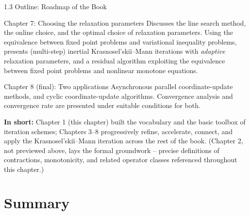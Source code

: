 \documentclass[aspectratio=169,10pt]{beamer}
\begin{document}
\begin{frame}[allowframebreaks]{1.3 Outline: Roadmap of the Book}
\begin{block}{Chapter 7: Choosing the relaxation parameters}
Discusses the line search method, the online choice, and the optimal
choice of relaxation parameters. Using the equivalence between fixed
point problems and variational inequality problems, presents (multi-step)
inertial Krasnosel'ski\u{i}--Mann iterations with \emph{adaptive}
relaxation parameters, and a residual algorithm exploiting the
equivalence between fixed point problems and nonlinear monotone
equations.
\end{block}

\framebreak

\begin{block}{Chapter 8 (final): Two applications}
Asynchronous parallel coordinate-update methods, and cyclic
coordinate-update algorithms. Convergence analysis and convergence rate
are presented under suitable conditions for both.
\end{block}

\textbf{In short:} Chapter 1 (this chapter) built the vocabulary and the
basic toolbox of iteration schemes; Chapters 3--8 progressively refine,
accelerate, connect, and apply the Krasnosel'ski\u{i}--Mann iteration
across the rest of the book. (Chapter 2, not previewed above, lays the
formal groundwork -- precise definitions of contractions, monotonicity,
and related operator classes referenced throughout this chapter.)

\end{frame}

\section{Summary}
\end{document}
